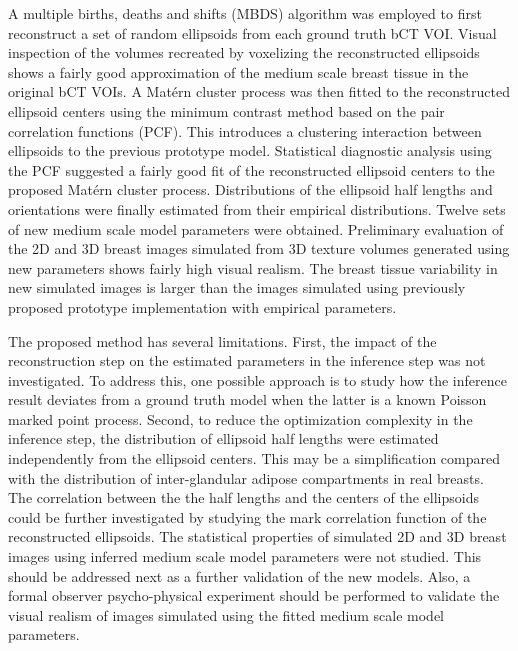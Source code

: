 \documentclass[journal]{IEEEtran}
\begin{document}
A multiple births, deaths and shifts (MBDS) algorithm was employed to
first reconstruct a set of random ellipsoids from each ground truth
bCT VOI. Visual inspection of the volumes recreated by voxelizing the
reconstructed ellipsoids shows a fairly good approximation of the
medium scale breast tissue in the original bCT VOIs. A Mat\'{e}rn
cluster process was then fitted to the reconstructed ellipsoid centers
using the minimum contrast method based on the pair correlation
functions (PCF). This introduces a clustering interaction between
ellipsoids to the previous prototype model. Statistical diagnostic
analysis using the PCF suggested a fairly good fit of the
reconstructed ellipsoid centers to the proposed Mat\'{e}rn cluster
process. Distributions of the ellipsoid half lengths and orientations
were finally estimated from their empirical distributions. Twelve sets
of new medium scale model parameters were obtained. Preliminary
evaluation of the 2D and 3D breast images simulated from 3D texture
volumes generated using new parameters shows fairly high visual
realism. The breast tissue variability in new simulated images is
larger than the images simulated using previously proposed prototype
implementation with empirical parameters.

The proposed method has several limitations. First, the impact of the
reconstruction step on the estimated parameters in the inference step
was not investigated. To address this, one possible approach is to
study how the inference result deviates from a ground truth model when
the latter is a known Poisson marked point process. Second, to reduce
the optimization complexity in the inference step, the distribution of
ellipsoid half lengths were estimated independently from the ellipsoid
centers. This may be a simplification compared with the distribution
of inter-glandular adipose compartments in real breasts. The
correlation between the the half lengths and the centers of the
ellipsoids could be further investigated by studying the mark
correlation function of the reconstructed ellipsoids. The statistical
properties of simulated 2D and 3D breast images using inferred medium
scale model parameters were not studied. This should be addressed next
as a further validation of the new models. Also, a formal observer
psycho-physical experiment should be performed to validate the visual
realism of images simulated using the fitted medium scale model
parameters.




\end{document}
